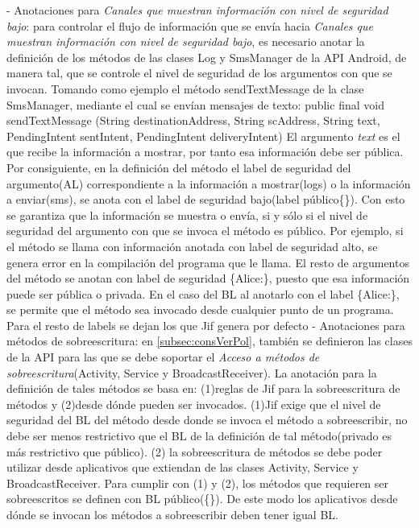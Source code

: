 - Anotaciones para \textit{Canales que muestran información con nivel de
seguridad bajo}: para controlar el flujo de información que se envía hacia
\textit{Canales que muestran información con nivel de seguridad bajo}, es
necesario anotar la definición de los métodos de las clases Log y SmsManager de
la API Android, de manera tal, que se controle el nivel de seguridad de los
argumentos con que se invocan.\newline
Tomando como ejemplo el método sendTextMessage de la clase SmsManager, mediante
el cual se envían mensajes de texto:\newline
public final void sendTextMessage (String destinationAddress, String
scAddress, String text, PendingIntent sentIntent, PendingIntent
deliveryIntent)\newline
El argumento \emph{text} es el que recibe la información a mostrar, por tanto
esa información debe ser pública.\newline 
Por consiguiente, en la definición del método el label de seguridad del
argumento(AL) correspondiente a la información a mostrar(logs) o la información
a enviar(sms), se anota con el label de seguridad bajo(label público\{\}). Con
esto se garantiza que la información se muestra o envía, si y sólo si el nivel
de seguridad del argumento con que se invoca el método es público. Por ejemplo,
si el método se llama con información anotada con label de seguridad alto, se
genera error en la compilación del programa que le llama.\newline 
El resto de argumentos del método se anotan con label de seguridad \{Alice:\},
puesto que esa información puede ser pública o privada.\newline
En el caso del BL al anotarlo con el label \{Alice:\}, se permite que el método
sea invocado desde cualquier punto de un programa. 
Para el resto de labels se dejan los que Jif genera por defecto\newline
- Anotaciones para métodos de sobreescritura: en \ref{subsec:consVerPol},
también se definieron las clases de la API para las que se debe soportar el
\textit{Acceso a métodos de sobreescritura}(Activity, Service y
BroadcastReceiver). La anotación para la definición de tales métodos se basa en:
(1)reglas de Jif para la sobreescritura de métodos y (2)desde dónde pueden ser
invocados. (1)Jif exige que el nivel de seguridad del BL del método desde donde
se invoca el método a sobreescribir, no debe ser menos restrictivo que el BL de
la definición de tal método(privado es más restrictivo que público). (2) la
sobreescritura de métodos se debe poder utilizar desde aplicativos que extiendan
de las clases Activity, Service y BroadcastReceiver.\newline 
Para cumplir con (1) y (2), los métodos que requieren ser sobreescritos se
definen con BL público(\{\}). De este modo los aplicativos desde dónde se
invocan los métodos a sobreescribir deben tener igual BL.

